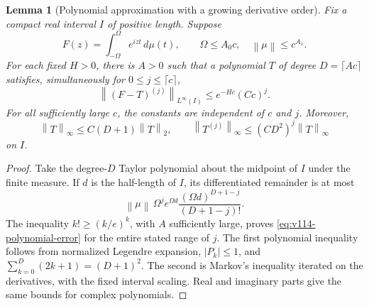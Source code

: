 \documentclass[11pt]{article}
\newtheorem{lemma}[theorem]{Lemma}
\theoremstyle{remark}
\newcommand{\norm}[1]{\left\lVert #1\right\rVert}
\begin{document}
\begin{lemma}[Polynomial approximation with a growing derivative order]
\label{lem:v114-entire-polynomial}
Fix a compact real interval $I$ of positive length. Suppose
\[
 F(z)=\int_{-\Omega}^{\Omega}e^{izt}\,d\mu(t),\qquad
 \Omega\le A_0c,\quad \norm\mu\le c^{A_1}.
\]
For each fixed $H>0$, there is $A>0$ such that a polynomial $T$ of degree
$D=\lceil Ac\rceil$ satisfies, simultaneously for $0\le j\le\lceil c\rceil$,
\begin{equation}\label{eq:v114-polynomial-error}
 \norm{(F-T)^{(j)}}_{L^\infty(I)}
       \le e^{-Hc}(Cc)^j.
\end{equation}
For all sufficiently large $c$, the constants are independent of $c$ and $j$. Moreover,
\[
 \norm T_\infty\le C(D+1)\norm T_2,\qquad
 \norm{T^{(j)}}_\infty\le(CD^2)^j\norm T_\infty
\]
on $I$.
\end{lemma}
\begin{proof}
Take the degree-$D$ Taylor polynomial about the midpoint of $I$ under the
finite measure. If $d$ is the half-length of $I$, its differentiated
remainder is at most
\[
 \norm\mu\,\Omega^j e^{\Omega d}
       \frac{(\Omega d)^{D+1-j}}{(D+1-j)!}.
\]
The inequality $k!\ge(k/e)^k$, with $A$ sufficiently large, proves
\eqref{eq:v114-polynomial-error} for the entire stated range of $j$.
The first polynomial inequality follows from normalized Legendre expansion,
$|P_k|\le1$, and $\sum_{k=0}^D(2k+1)=(D+1)^2$. The second is Markov's
inequality iterated on the derivatives, with the fixed interval scaling.
Real and imaginary parts give the same bounds for complex polynomials.
\end{proof}
\end{document}
